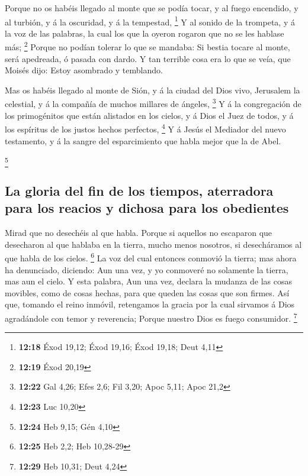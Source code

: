  Porque no os habéis llegado al monte que se podía tocar,
y al fuego encendido, y al turbión, y á la oscuridad, y á la tempestad,
\footnote{\textbf{12:18} Éxod 19,12; Éxod 19,16; Éxod 19,18; Deut 4,11}
 Y al sonido de la trompeta, y á la voz de las palabras,
la cual los que la oyeron rogaron que no se les hablase más; \footnote{\textbf{12:19}
  Éxod 20,19}  Porque no podían tolerar lo que se
mandaba: Si bestia tocare al monte, será apedreada, ó pasada con dardo.
 Y tan terrible cosa era lo que se veía, que Moisés dijo:
Estoy asombrado y temblando.

 Mas os habéis llegado al monte de Sión, y á la ciudad
del Dios vivo, Jerusalem la celestial, y á la compañía de muchos
millares de ángeles, \footnote{\textbf{12:22} Gal 4,26; Efes 2,6; Fil
  3,20; Apoc 5,11; Apoc 21,2}  Y á la congregación de los
primogénitos que están alistados en los cielos, y á Dios el Juez de
todos, y á los espíritus de los justos hechos perfectos, \footnote{\textbf{12:23}
  Luc 10,20}  Y á Jesús el Mediador del nuevo testamento,
y á la sangre del esparcimiento que habla mejor que la de Abel.

\footnote{\textbf{12:24} Heb 9,15; Gén 4,10}

\hypertarget{la-gloria-del-fin-de-los-tiempos-aterradora-para-los-reacios-y-dichosa-para-los-obedientes}{%
\subsection{La gloria del fin de los tiempos, aterradora para los
reacios y dichosa para los
obedientes}\label{la-gloria-del-fin-de-los-tiempos-aterradora-para-los-reacios-y-dichosa-para-los-obedientes}}

 Mirad que no desechéis al que habla. Porque si aquellos
no escaparon que desecharon al que hablaba en la tierra, mucho menos
nosotros, si desecháramos al que habla de los cielos. \footnote{\textbf{12:25}
  Heb 2,2; Heb 10,28-29}  La voz del cual entonces
conmovió la tierra; mas ahora ha denunciado, diciendo: Aun una vez, y yo
conmoveré no solamente la tierra, mas aun el cielo.  Y
esta palabra, Aun una vez, declara la mudanza de las cosas movibles,
como de cosas hechas, para que queden las cosas que son firmes.
 Así que, tomando el reino inmóvil, retengamos la gracia
por la cual sirvamos á Dios agradándole con temor y reverencia;
 Porque nuestro Dios es fuego consumidor. \footnote{\textbf{12:29}
  Heb 10,31; Deut 4,24}

